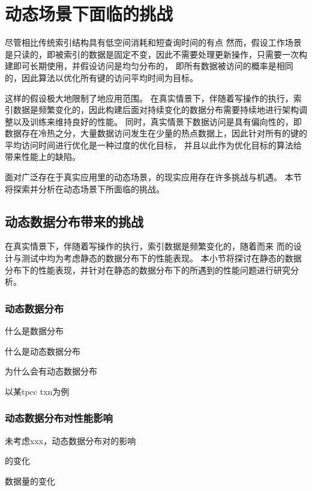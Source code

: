 \chapter{动态场景下{\li}面临的挑战}
\label{chap:challenge}

尽管{\li}相比传统索引结构具有低空间消耗和短查询时间的有点
然而，{\li}假设工作场景是只读的，即被索引的数据是固定不变，因此不需要处理更新操作，{\li}只需要一次构建即可长期使用，并假设访问是均匀分布的，
即所有数据被访问的概率是相同的，因此{\li}算法以优化所有键的访问平均时间为目标。

这样的假设极大地限制了{\li}地应用范围。
在真实情景下，伴随着写操作的执行，索引数据是频繁变化的，因此{\li}构建后面对持续变化的数据分布需要持续地进行架构调整以及训练来维持良好的{\li}性能。
同时，真实情景下数据访问是具有偏向性的，即数据存在冷热之分，大量数据访问发生在少量的热点数据上，因此针对所有的键的平均访问时间进行优化是一种过度的优化目标，
并且以此作为优化目标的算法给{\li}带来性能上的缺陷。

面对广泛存在于真实应用里的动态场景，{\li}的现实应用存在许多挑战与机遇。
本节将探索并分析{\li}在动态场景下所面临的挑战。

\section{动态数据分布带来的挑战}

在真实情景下，伴随着写操作的执行，索引数据是频繁变化的，随着而来
而{\li}的设计与测试中均为考虑静态的数据分布下的性能表现。
本小节将探讨{\li}在静态的数据分布下的性能表现，并针对{\li}在静态的数据分布下的所遇到的性能问题进行研究分析。

\subsection{动态数据分布}

什么是数据分布

什么是动态数据分布

为什么会有动态数据分布

以某tpcc txn为例

\subsection{动态数据分布对{\li}性能影响}

{\li}未考虑xxx，动态数据分布对{\li}的影响

{\cdf}的变化

数据量的变化

